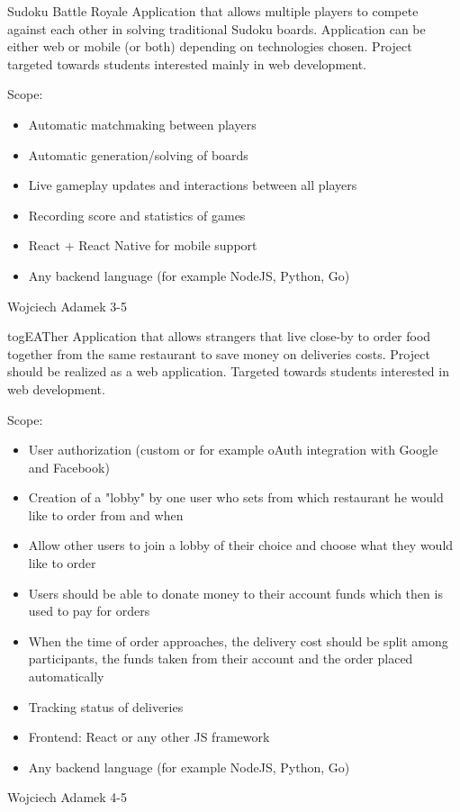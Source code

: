 \begin{project}
{Sudoku Battle Royale}
{Application that allows multiple players to compete against each other in solving traditional Sudoku boards. Application can be either web or mobile (or both) depending on technologies chosen. Project targeted towards students interested mainly in web development.}
{
Scope:
\begin{itemize}
	\item Automatic matchmaking between players
	\item Automatic generation/solving of boards
	\item Live gameplay updates and interactions between all players
	\item Recording score and statistics of games
\end{itemize}
}
{
\begin{itemize}
	\item React + React Native for mobile support
	\item Any backend language (for example NodeJS, Python, Go)
\end{itemize}
}
{Wojciech Adamek}
{3-5}
\end{project}
\begin{project}
{togEATher}
{Application that allows strangers that live close-by to order food together from the same restaurant to save money on deliveries costs. Project should be realized as a web application. Targeted towards students interested in web development.}
{
Scope:
\begin{itemize}
	\item User authorization (custom or for example oAuth integration with Google and Facebook)
	\item Creation of a "lobby" by one user who sets from which restaurant he would like to order from and when
	\item Allow other users to join a lobby of their choice and choose what they would like to order
	\item Users should be able to donate money to their account funds which then is used to pay for orders
	\item When the time of order approaches, the delivery cost should be split among participants, the funds taken from their account and the order placed automatically
	\item Tracking status of deliveries
\end{itemize}
}
{
\begin{itemize}
	\item Frontend: React or any other JS framework
	\item Any backend language (for example NodeJS, Python, Go)
\end{itemize}
}
{Wojciech Adamek}
{4-5}
\end{project}
